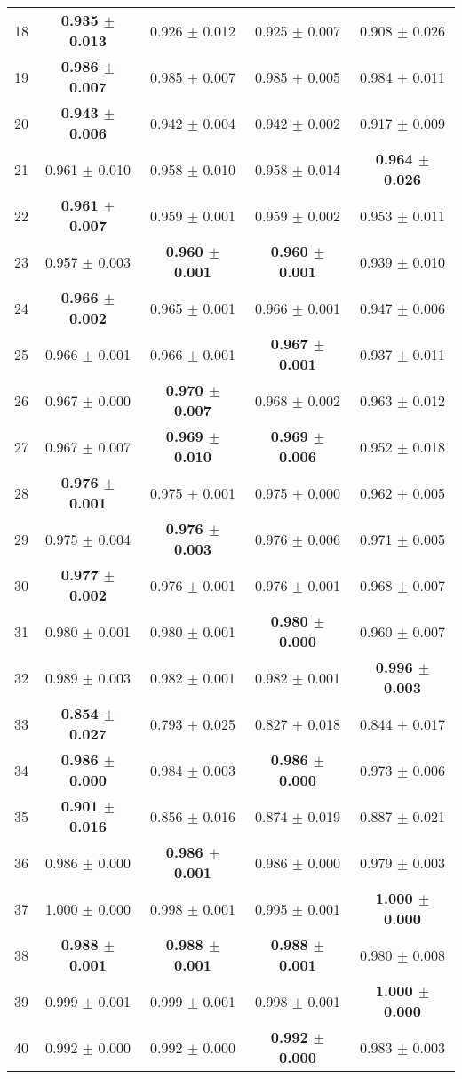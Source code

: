 \begin{table}[!ht]
{\begin{tabular}{r c c c c}
18 & \textbf{0.935 $\pm$ 0.013} & 0.926 $\pm$ 0.012 & 0.925 $\pm$ 0.007 & 0.908 $\pm$ 0.026 \\
19 & \textbf{0.986 $\pm$ 0.007} & 0.985 $\pm$ 0.007 & 0.985 $\pm$ 0.005 & 0.984 $\pm$ 0.011 \\
20 & \textbf{0.943 $\pm$ 0.006} & 0.942 $\pm$ 0.004 & 0.942 $\pm$ 0.002 & 0.917 $\pm$ 0.009 \\
21 & 0.961 $\pm$ 0.010 & 0.958 $\pm$ 0.010 & 0.958 $\pm$ 0.014 & \textbf{0.964 $\pm$ 0.026} \\
22 & \textbf{0.961 $\pm$ 0.007} & 0.959 $\pm$ 0.001 & 0.959 $\pm$ 0.002 & 0.953 $\pm$ 0.011 \\
23 & 0.957 $\pm$ 0.003 & \textbf{0.960 $\pm$ 0.001} & \textbf{0.960 $\pm$ 0.001} & 0.939 $\pm$ 0.010 \\
24 & \textbf{0.966 $\pm$ 0.002} & 0.965 $\pm$ 0.001 & 0.966 $\pm$ 0.001 & 0.947 $\pm$ 0.006 \\
25 & 0.966 $\pm$ 0.001 & 0.966 $\pm$ 0.001 & \textbf{0.967 $\pm$ 0.001} & 0.937 $\pm$ 0.011 \\
26 & 0.967 $\pm$ 0.000 & \textbf{0.970 $\pm$ 0.007} & 0.968 $\pm$ 0.002 & 0.963 $\pm$ 0.012 \\
27 & 0.967 $\pm$ 0.007 & \textbf{0.969 $\pm$ 0.010} & \textbf{0.969 $\pm$ 0.006} & 0.952 $\pm$ 0.018 \\
28 & \textbf{0.976 $\pm$ 0.001} & 0.975 $\pm$ 0.001 & 0.975 $\pm$ 0.000 & 0.962 $\pm$ 0.005 \\
29 & 0.975 $\pm$ 0.004 & \textbf{0.976 $\pm$ 0.003} & 0.976 $\pm$ 0.006 & 0.971 $\pm$ 0.005 \\
30 & \textbf{0.977 $\pm$ 0.002} & 0.976 $\pm$ 0.001 & 0.976 $\pm$ 0.001 & 0.968 $\pm$ 0.007 \\
31 & 0.980 $\pm$ 0.001 & 0.980 $\pm$ 0.001 & \textbf{0.980 $\pm$ 0.000} & 0.960 $\pm$ 0.007 \\
32 & 0.989 $\pm$ 0.003 & 0.982 $\pm$ 0.001 & 0.982 $\pm$ 0.001 & \textbf{0.996 $\pm$ 0.003} \\
33 & \textbf{0.854 $\pm$ 0.027} & 0.793 $\pm$ 0.025 & 0.827 $\pm$ 0.018 & 0.844 $\pm$ 0.017 \\
34 & \textbf{0.986 $\pm$ 0.000} & 0.984 $\pm$ 0.003 & \textbf{0.986 $\pm$ 0.000} & 0.973 $\pm$ 0.006 \\
35 & \textbf{0.901 $\pm$ 0.016} & 0.856 $\pm$ 0.016 & 0.874 $\pm$ 0.019 & 0.887 $\pm$ 0.021 \\
36 & 0.986 $\pm$ 0.000 & \textbf{0.986 $\pm$ 0.001} & 0.986 $\pm$ 0.000 & 0.979 $\pm$ 0.003 \\
37 & 1.000 $\pm$ 0.000 & 0.998 $\pm$ 0.001 & 0.995 $\pm$ 0.001 & \textbf{1.000 $\pm$ 0.000} \\
38 & \textbf{0.988 $\pm$ 0.001} & \textbf{0.988 $\pm$ 0.001} & \textbf{0.988 $\pm$ 0.001} & 0.980 $\pm$ 0.008 \\
39 & 0.999 $\pm$ 0.001 & 0.999 $\pm$ 0.001 & 0.998 $\pm$ 0.001 & \textbf{1.000 $\pm$ 0.000} \\
40 & 0.992 $\pm$ 0.000 & 0.992 $\pm$ 0.000 & \textbf{0.992 $\pm$ 0.000} & 0.983 $\pm$ 0.003 \\
\end{tabular}}
\end{table}
